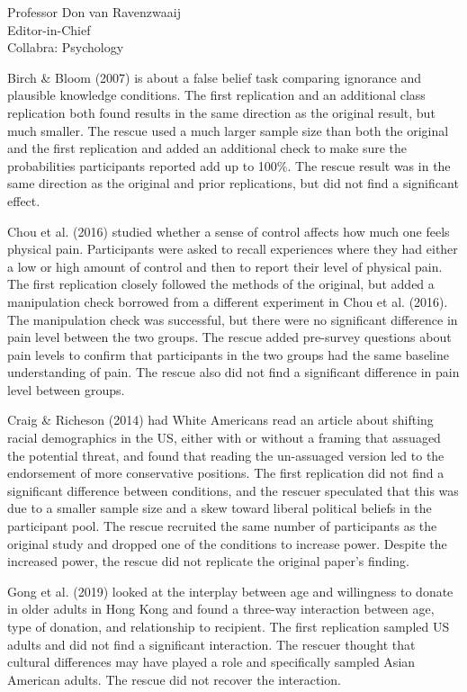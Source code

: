 \documentclass{stanfordletter}
\begin{document}
\begin{letter}{Professor Don van Ravenzwaaij \\ Editor-in-Chief \\ Collabra: Psychology }
{		 	Birch \& Bloom (2007) is about a false belief task comparing ignorance and plausible knowledge conditions.
		 	The first replication and an additional class replication both found results in the same direction as the original result, but much smaller.
		 	The rescue used a much larger sample size than both the original and the first replication and added an additional check to make sure the probabilities participants reported add up to 100\%.
		 	The rescue result was in the same direction as the original and prior replications, but did not find a significant effect.
		 	\newline
		 	
		 	Chou et al. (2016) studied whether a sense of control affects how much one feels physical pain. Participants were asked to recall experiences where they had either a low or high amount of control and then to report their level of physical pain. The first replication closely followed the methods of the original, but added a manipulation check borrowed from a different experiment in Chou et al. (2016). The manipulation check was successful, but there were no significant difference in pain level between the two groups. The rescue added pre-survey questions about pain levels to confirm that participants in the two groups had the same baseline understanding of pain. The rescue also did not find a significant difference in pain level between groups.
		 	\newline
		 	
		 	Craig \& Richeson (2014) had White Americans read an article about shifting racial demographics in the US, either with or without a framing that assuaged the potential threat, and found that reading the un-assuaged version led to the endorsement of more conservative positions.
		 	The first replication did not find a significant difference between conditions, and the rescuer speculated that this was due to a smaller sample size and a skew toward liberal political beliefs in the participant pool.
		 	The rescue recruited the same number of participants as the original study and dropped one of the conditions to increase power.
		 	Despite the increased power, the rescue did not replicate the original paper's finding.
		 	\newline
		 	
		 	Gong et al. (2019) looked at the interplay between age and willingness to donate in older adults in Hong Kong and found a three-way interaction between age, type of donation, and relationship to recipient.
		 	The first replication sampled US adults and did not find a significant interaction.
		 	The rescuer thought that cultural differences may have played a role and specifically sampled Asian American adults.
		 	The rescue did not recover the interaction.
		 	\newline
		 	
}
\end{letter}
\end{document}
